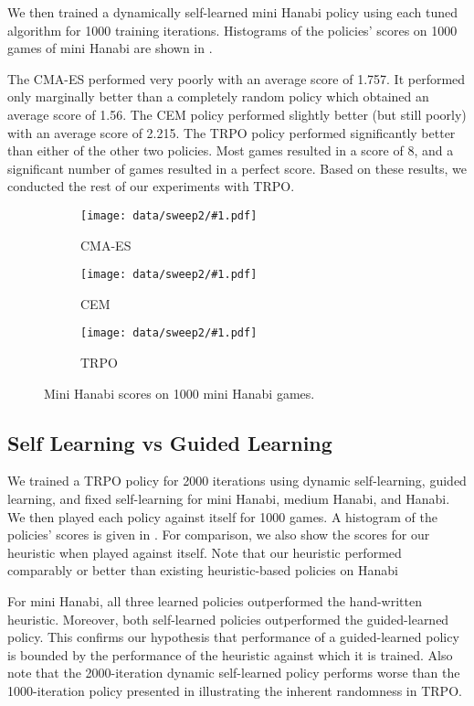 We then trained a dynamically self-learned mini Hanabi policy using each
tuned algorithm for 1000 training iterations. Histograms of the policies'
scores on 1000 games of mini Hanabi are shown in .

The CMA-ES performed very poorly with an average score of 1.757. It performed
only marginally better than a completely random policy which obtained an
average score of 1.56.
%
The CEM policy performed slightly better (but still poorly) with an average
score of 2.215.
%
The TRPO policy performed significantly better than either of the other two
policies. Most games resulted in a score of 8, and a significant number of
games resulted in a perfect score.
%
Based on these results, we conducted the rest of our experiments with TRPO.

\begin{figure}[ht]
  \newcommand{\algosubfig}[3]{%
    \begin{subfigure}[b]{0.32\textwidth}
      \centering
      \texttt{[image: data/sweep2/\#1.pdf]}
      \caption{#2}\label{fig:#3}
    \end{subfigure}
  }

  \centering
  \algosubfig{CMA-ES}{CMA-ES}{cmaes}
  \algosubfig{CEM}{CEM}{cem}
  \algosubfig{TRPO}{TRPO}{trpo}
  \caption{Mini Hanabi scores on 1000 mini Hanabi games.}\label{fig:algos}
\end{figure}

\subsection{Self Learning vs Guided Learning}
We trained a TRPO policy for 2000 iterations using dynamic self-learning,
guided learning, and fixed self-learning for mini Hanabi, medium Hanabi, and
Hanabi. We then played each policy against itself for 1000 games. A histogram
of the policies' scores is given in . For comparison, we also show
the scores for our heuristic when played against itself. Note that our
heuristic performed comparably or better than existing heuristic-based policies
on Hanabi~\cite{osawa2015solving,walton2017evaluating}

For mini Hanabi, all three learned policies outperformed the hand-written
heuristic. Moreover, both self-learned policies outperformed the guided-learned
policy. This confirms our hypothesis that performance of a guided-learned
policy is bounded by the performance of the heuristic against which it is
trained. Also note that the 2000-iteration dynamic self-learned policy performs
worse than the 1000-iteration policy presented in  illustrating
the inherent randomness in TRPO.

